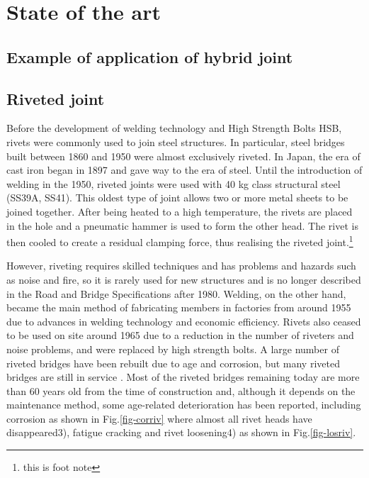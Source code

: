 \chapter{State of the art}
\label{ch2}

\begin{spacing}{1.25} %
\minitoc %
\end{spacing} %
\onehalfspacing %

\section{Example of application of hybrid joint}

\section{Riveted joint}

Before the development of welding technology and High Strength Bolts \ac{HSB}, rivets were commonly used to join steel structures. In particular, steel bridges built between 1860 and 1950 were almost exclusively riveted. In Japan, the era of cast iron began in 1897 and gave way to the era of steel. Until the introduction of welding in the 1950, riveted joints were used with 40 kg class structural steel (SS39A, SS41)\cite{rivet1934}. This oldest type of joint allows two or more metal sheets to be joined together. After being heated to a high temperature, the rivets are placed in the hole and a pneumatic hammer is used to form the other head. The rivet is then cooled to create a residual clamping force, thus realising the riveted joint.\footnote{this is foot note}

However, riveting requires skilled techniques and has problems and hazards such as noise and fire, so it is rarely used for new structures and is no longer described in the Road and Bridge Specifications after 1980. Welding, on the other hand, became the main method of fabricating members in factories from around 1955 due to advances in welding technology and economic efficiency. Rivets also ceased to be used on site around 1965 due to a reduction in the number of riveters and noise problems, and were replaced by high strength bolts.
A large number of riveted bridges have been rebuilt due to age and corrosion, but many riveted bridges are still in service \cite{COLLETTE2014}. Most of the riveted bridges remaining today are more than 60 years old from the time of construction and, although it depends on the maintenance method, some age-related deterioration has been reported, including corrosion as shown in Fig.\ref{fig-corriv} where almost all rivet heads have disappeared3), fatigue cracking and rivet loosening4) as shown in Fig.\ref{fig-losriv}.

